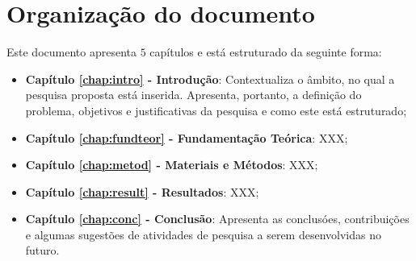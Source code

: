\section{Organização do documento}
\label{section:organizacao}

Este documento apresenta $5$ capítulos e está estruturado da seguinte forma:

\begin{itemize}

  \item \textbf{Capítulo \ref{chap:intro} - Introdução}: Contextualiza o âmbito, no qual a pesquisa proposta está inserida. Apresenta, portanto, a definição do problema, objetivos e justificativas da pesquisa e como este \thetypeworkthree está estruturado;
  \item \textbf{Capítulo \ref{chap:fundteor} - Fundamentação Teórica}: XXX;
  \item \textbf{Capítulo \ref{chap:metod} - Materiais e Métodos}: XXX;
  \item \textbf{Capítulo \ref{chap:result} - Resultados}: XXX;
  \item \textbf{Capítulo \ref{chap:conc} - Conclusão}: Apresenta as conclusóes, contribuições e algumas sugestões de atividades de pesquisa a serem desenvolvidas no futuro.

\end{itemize}
